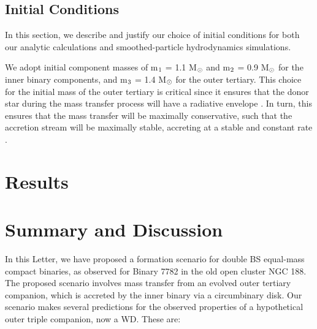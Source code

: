 \documentclass{aastex62}
\begin{document}
\subsection{Initial Conditions} \label{ICs}

In this section, we describe and justify our choice of initial conditions for both our analytic calculations and smoothed-particle hydrodynamics simulations.

We adopt initial component masses of m$_{\rm 1}$ = 1.1 M$_{\rm \odot}$ and m$_{\rm 2}$ = 0.9 M$_{\rm \odot}$ for the inner binary components, and m$_{\rm 3}$ = 1.4 M$_{\rm \odot}$ for the outer tertiary.  This choice for the initial mass of the outer tertiary is critical since it ensures that the donor star during the mass transfer process will have a radiative envelope \citep[e.g.][]{maeder09}.  In turn, this ensures that the mass transfer will be maximally conservative, such that the accretion stream will be maximally stable, accreting at a stable and constant rate \citep[e.g.][]{iben91}.  

\section{Results} \label{results}


\section{Summary and Discussion} \label{discussion}

In this Letter, we have proposed a formation scenario for double BS equal-mass compact binaries, as observed for Binary 7782 in the old open cluster NGC 188.  The proposed scenario involves mass transfer from an evolved outer tertiary companion, which is accreted by the inner binary via a circumbinary disk.  Our scenario makes several predictions for the observed properties of a hypothetical outer triple companion, now a WD.  These are:
\end{document}
